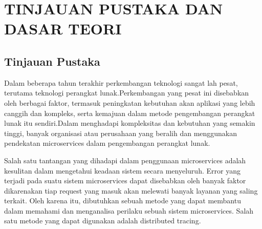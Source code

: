
\chapter{TINJAUAN PUSTAKA DAN DASAR TEORI}                

\section{Tinjauan Pustaka}
  Dalam beberapa tahun terakhir perkembangan teknologi sangat lah pesat, terutama teknologi perangkat lunak.Perkembangan yang pesat ini disebabkan oleh berbagai faktor, termasuk peningkatan kebutuhan akan aplikasi yang lebih canggih dan kompleks, serta kemajuan dalam metode pengembangan perangkat lunak itu sendiri.Dalam menghadapi kompleksitas dan kebutuhan yang semakin tinggi, banyak organisasi atau perusahaan yang beralih dan menggunakan pendekatan microservices dalam pengembangan perangkat lunak.


  Salah satu tantangan yang dihadapi dalam penggunaan microservices adalah kesulitan dalam mengetahui keadaan sistem secara menyeluruh. Error yang terjadi pada suatu sistem microservices dapat disebabkan oleh banyak faktor dikarenakan tiap request yang masuk akan melewati banyak layanan yang saling terkait. Oleh karena itu, dibutuhkan sebuah metode yang dapat membantu dalam memahami dan menganalisa perilaku sebuah sistem microservices. Salah satu metode yang dapat digunakan adalah distributed tracing.

